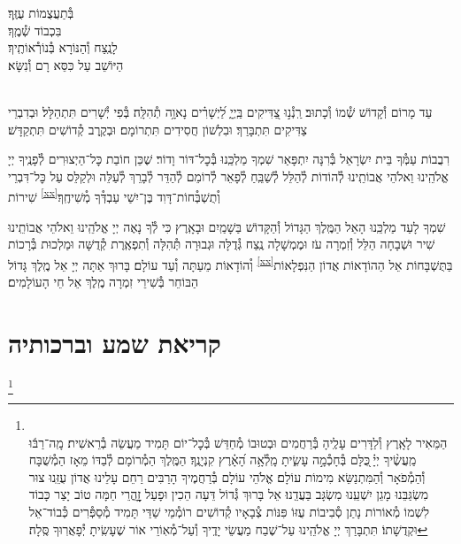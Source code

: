 \documentclass[twoside, openany, parskip=half, 11pt]{book}
\begin{document}

בְּ֯תַעֲצֻמוֹת עֻזֶּֽךָ׃\\
בִּכְבוֹד שְׁ֯מֶֽךָ׃\\
לָנֶֽצַח וְ֯הַנּוֹרָא בְּ֯נוֹרְ֯אוֹתֶֽיךָ׃\\
הַיּוֹשֵׁב עַל כִּסֵּא רָם וְ֯נִשָּׂא׃

\\
עַד מָרוֹם וְ֯קָדוֹשׁ שְׁ֯מוֹ וְ֯כָתוּב׃ רַֽנְ֯נ֣וּ צַ֭דִּיקִים בַּֽיְיָ֑ לַ֝יְשָׁרִ֗ים נָאוָ֥ה תְ֯הִלָּֽה׃ בְּ֯פִי יְ֯שָׁרִים תִּתְהַלָּל׃ וּבְדִבְרֵי צַדִּיקִים תִּתְבָּרַךְ׃ וּבִלְשׁוֹן חֲסִידִים תִּתְרוֹמָם׃ וּבְקֶֽרֶב קְ֯דוֹשִׁים תִּתְקַדָּשׁ׃

רִבֲבוֹת עַמְּ֯ךָ בֵּית יִשְׂרָאֵל בְּ֯רִנָּה יִתְפָּאַר שִׁמְךָ מַלְכֵּֽנוּ בְּ֯כׇל־דּוֹר וָדוֹר׃ שֶׁכֵּן חוֹבַת כׇּל־הַיְצוּרִים לְ֯פָנֶֽיךָ יְיָ אֱלֹהֵֽינוּ וֵאלֹהֵי אֲבוֹתֵֽינוּ לְ֯הוֹדוֹת לְ֯הַלֵּל לְ֯שַׁבֵּֽחַ לְ֯פָאֵר לְ֯רוֹמֵם לְ֯הַדֵּר לְ֯בָרֵךְ לְ֯עַלֵּה וּלְקַלֵּס עַל כׇּל־דִּבְרֵי שִׁירוֹת \textsuperscript{\ref{xx}}וְ֯תֻשְׁבְּ֯חוֹת־דָּוִד בֶּן־יִשַׁי עַבְדְּ֯ךָ מְ֯שִׁיחֶֽךָ׃


שִׁמְךָ לָעַד מַלְכֵּֽנוּ הָאֵל הַמֶּֽלֶךְ הַגָּדוֹל וְ֯הַקָּדוֹשׁ בַּשָׁמַֽיִם וּבָאָֽרֶץ כִּי לְ֯ךָ נָאֶה יְיָ אֱלֹהֵֽינוּ וֵאלֹהֵי אֲבוֹתֵֽינוּ שִׁיר וּשְׁבָחָה הַלֵּל וְ֯זִמְרָה עֹז וּמֶמְשָׁלָה נֶֽצַח גְּ֯דֻלָּה וּגְבוּרָה תְּ֯הִלָּה וְ֯תִפְאֶֽרֶת קְ֯דֻשָּׁה וּמַלְכוּת בְּ֯רָכוֹת וְ֯הוֹדָאוֹת מֵעַתָּה וְ֯עַד עוֹלָם׃
בָּרוּךְ אַתָּה יְיָ אֵל מֶֽלֶךְ גָּדוֹל \textsuperscript{\ref{xx}}בַּתֻּשְׁבָּחוֹת אֵל הַהוֹדָאוֹת אֲדוֹן הַנִּפְלָאוֹת הַבּוֹחֵר בְּ֯שִׁירֵי זִמְרָה מֶֽלֶךְ אֵל חֵי הָעוֹלָמִים׃
\mimaamakim
\halfkaddish

\section*{ קריאת שמע וברכותיה }

\barachu


\footnote{\\
הַמֵּאִיר לָאָֽרֶץ וְ֯לַדָּרִים עָלֶֽיהָ בְּ֯רַחֲמִים וּבְטוּבוֹ מְ֯חַדֵּשׁ בְּ֯כׇל־יוֹם תָּמִיד מַעֲשֵׂה בְ֯רֵאשִׁית׃
מָֽה־רַבּ֬וּ מַֽעֲשֶׂ֨יךָ יְיָ֗ ֖כֻּלָּם בְּ֯חָכְ֯מָ֣ה עָשִׂ֑יתָ מָֽלְ֯אָ֥ה הָ֝אָ֗רֶץ קִנְיָנֶֽךָ׃ הַמֶּֽלֶךְ הַמְ֯רוֹמָם לְ֯בַדּוֹ מֵאָז הַמְ֯שֻׁבָּח וְ֯הַמְ֯פֹאָר וְ֯הַמִּתְנַשֵּׂא מִימוֹת עוֹלָם׃ אֱלֹהֵי עוֹלָם בְּ֯רַחֲמֶיךָ הָרַבִּים רַחֵם עָלֵינוּ אֲדוֹן עֻזֵּֽנוּ צוּר מִשְׂגַּבֵּנוּ מָגֵן יִשְׁעֵֽנוּ מִשְׂגָּב בַּעֲדֵֽנוּ׃ אֵל בָּרוּךְ גְּ֯דוֹל דֵּעָה הֵכִין וּפָעַל זׇׇׇׇׇהֳרֵי חַמָּה טוֹב יָצַר כָּבוֹד לִשְׁמוֹ מְ֯אוֹרוֹת נָתַן סְ֯בִיבוֹת עֻזּוֹ פִּנּוֹת צְ֯בָאָיו קְ֯דוֹשִׁים רוֹמְ֯מֵי שַׁדַּי תָּמִיד מְ֯סַפְּ֯רִים כְּ֯בוֹד־אֵל וּקְדֻשָׁתוֹ׃ תִּתְבָּרַךְ יְיָ אֱלֹהֵֽינוּ עַל־שֶׁבַח מַעֲשֵׂי יָדֶֽיךָ וְ֯עַל־מְ֯אֽוֹרֵי אוֹר שֶׁעָשִֽׂיתָ יְ֯פָאֲרֽוּךָ סֶּֽלָה׃
}
\end{document}
